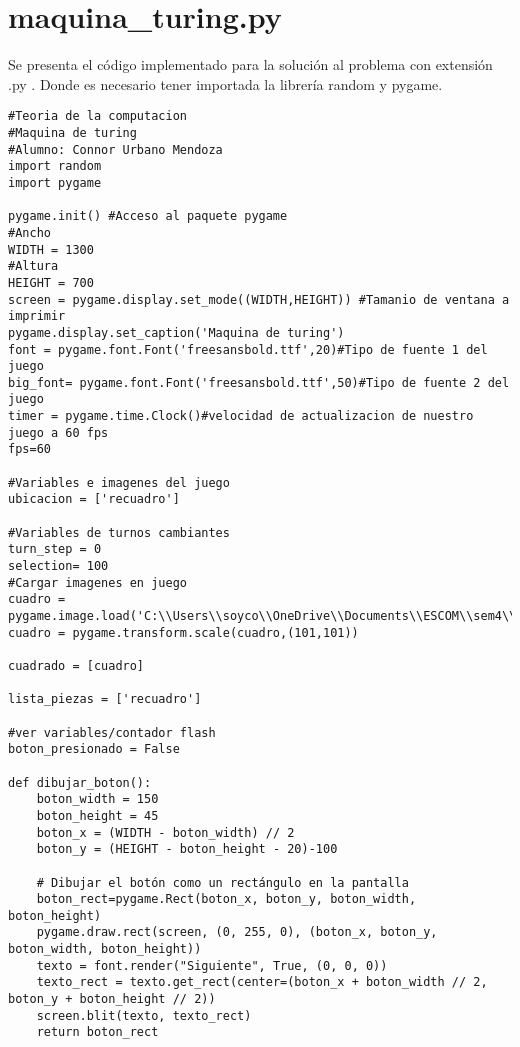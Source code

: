 \section{maquina\_turing.py}
Se presenta el código implementado para la solución al problema con extensión .py . Donde es necesario tener importada la librería random y pygame. \newline
\\
\begin{lstlisting}
#Teoria de la computacion
#Maquina de turing
#Alumno: Connor Urbano Mendoza
import random
import pygame

pygame.init() #Acceso al paquete pygame
#Ancho
WIDTH = 1300
#Altura
HEIGHT = 700
screen = pygame.display.set_mode((WIDTH,HEIGHT)) #Tamanio de ventana a imprimir
pygame.display.set_caption('Maquina de turing')
font = pygame.font.Font('freesansbold.ttf',20)#Tipo de fuente 1 del juego
big_font= pygame.font.Font('freesansbold.ttf',50)#Tipo de fuente 2 del juego
timer = pygame.time.Clock()#velocidad de actualizacion de nuestro juego a 60 fps
fps=60

#Variables e imagenes del juego
ubicacion = ['recuadro']

#Variables de turnos cambiantes
turn_step = 0
selection= 100
#Cargar imagenes en juego
cuadro = pygame.image.load('C:\\Users\\soyco\\OneDrive\\Documents\\ESCOM\\sem4\\Teoria\\P2\\turing\\img\\cuadro.png')
cuadro = pygame.transform.scale(cuadro,(101,101))

cuadrado = [cuadro]

lista_piezas = ['recuadro']

#ver variables/contador flash
boton_presionado = False

def dibujar_boton():
    boton_width = 150
    boton_height = 45
    boton_x = (WIDTH - boton_width) // 2
    boton_y = (HEIGHT - boton_height - 20)-100

    # Dibujar el botón como un rectángulo en la pantalla
    boton_rect=pygame.Rect(boton_x, boton_y, boton_width, boton_height)
    pygame.draw.rect(screen, (0, 255, 0), (boton_x, boton_y, boton_width, boton_height))
    texto = font.render("Siguiente", True, (0, 0, 0))
    texto_rect = texto.get_rect(center=(boton_x + boton_width // 2, boton_y + boton_height // 2))
    screen.blit(texto, texto_rect)
    return boton_rect
   

\end{lstlisting}
